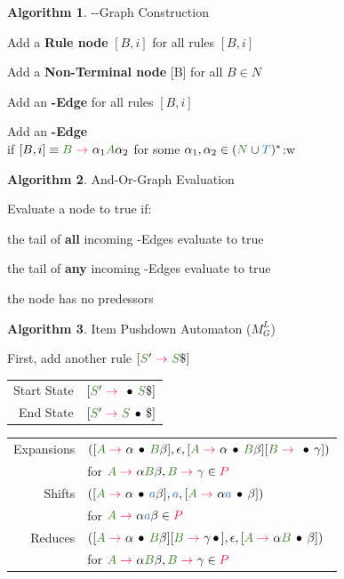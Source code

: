 \documentclass[10pt, landscape]{article}
\theoremstyle{definition}
\newtheorem{algorithm}{Algorithm}[section]
\newcommand{\Op}[1]{\textcolor{WildStrawberry}{#1}}
\newcommand{\Bul}{\,\bullet\,}
\newcommand{\derive}[1][]{\Op{\;\rightarrow_{#1}\;}}
\newcommand{\nontermcolor}{OliveGreen}
\newcommand{\nt}[1]{\textcolor{\nontermcolor}{#1}}
\newcommand{\nonterms}{\nt{N}}
\newcommand{\ntA}{\nt{A}}
\newcommand{\ntB}{\nt{B}}
\newcommand{\ntS}{\nt{S}}
\newcommand{\termcolor}{NavyBlue}
\newcommand{\terms}{\textcolor{\termcolor}{T}}
\newcommand{\termA}{\textcolor{\termcolor}{a}}
\newcommand{\prodcolor}{WildStrawberry}
\newcommand{\prods}{\textcolor{\prodcolor}{P}}
\newcommand{\grammarwords}{(\nonterms \cup \terms)^{*}}
\begin{document}
\begin{multicols*}{3}
{\begin{algorithm}{--Graph Construction}
    \begin{compactenum}
      \item Add a \textbf{Rule node} $[B,i]$ for all rules $[B,i]$
      \item Add a \textbf{Non-Terminal node} [B] for all $B \in N$
      \item Add an \textbf{-Edge} \obox{$[B,i] \rightarrow [B]$} for all rules $[B,i]$
      \item Add an \textbf{-Edge} \abox{$[B] \rightarrow [B,i]$} \\if $[B,i] \equiv \ntB \derive \alpha_{1} \ntA \alpha_{2}$ for some $\alpha_{1}, \alpha_{2} \in \grammarwords$:w
    \end{compactenum}

  \end{algorithm}

  \begin{algorithm}{And-Or-Graph Evaluation}

    Evaluate a node to true if:
    \begin{compactenum}
      \item the tail of \textbf{all} incoming -Edges evaluate to true
      \item the tail of \textbf{any} incoming -Edges evaluate to true
      \item the node has no predessors
    \end{compactenum}

  \end{algorithm}
}

\begin{algorithm}{Item Pushdown Automaton ($M_{G}^{L}$)}

  First, add another rule $[\ntS' \derive \ntS\$]$

  \begin{tabular}{r l}
    Start State    & $[\ntS' \derive \Bul \ntS \$]$ \\
    End State      & $[\ntS' \derive \ntS\Bul \$]$
  \end{tabular}

  \begin{tabular}{r l}
    Expansions & $([\ntA \derive \alpha \Bul \ntB \beta], \epsilon, [\ntA \derive \alpha \Bul \ntB \beta][\ntB \derive \Bul\gamma])$ \\
               & for $\ntA \derive \alpha \ntB \beta, \ntB \derive \gamma \in \prods$ \\
    Shifts     & $([\ntA \derive \alpha \Bul \termA \beta], \termA, [\ntA \derive \alpha \termA \Bul \beta])$ \\
               & for $\ntA \derive \alpha \termA \beta \in \prods$ \\
    Reduces    & $([\ntA \derive \alpha \Bul \ntB \beta][\ntB \derive \gamma\Bul], \epsilon, [\ntA \derive \alpha \ntB \Bul \beta])$ \\
               & for $\ntA \derive \alpha \ntB \beta, \ntB \derive \gamma \in \prods$ \\
  \end{tabular}


\end{algorithm}
\end{multicols*}
\end{document}
